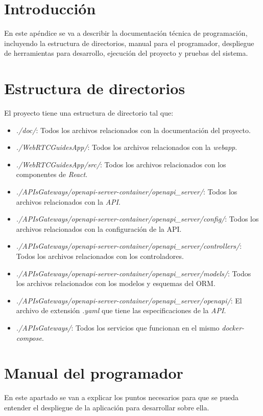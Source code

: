 \section{Introducción}
En este apéndice se va a describir la documentación técnica de programación, incluyendo la estructura de directorios, manual para el programador, despliegue de herramientas para desarrollo, ejecución del proyecto y pruebas del sistema.

\section{Estructura de directorios}
El proyecto tiene una estructura de directorio tal que:
\begin{itemize}
    \item \textit{./doc/}: Todos los archivos relacionados con la documentación del proyecto.
    \item \textit{./WebRTCGuidesApp/}: Todos los archivos relacionados con la \textit{webapp}.
    \item \textit{./WebRTCGuidesApp/src/}: Todos los archivos relacionados con los componentes de \textit{React}.
    \item \textit{./APIsGateways/openapi-server-container/openapi\_server/}: Todos los archivos relacionados con la \textit{API}.
    \item \textit{./APIsGateways/openapi-server-container/openapi\_server/config/}: Todos los archivos relacionados con la configuración de la API.
    \item \textit{./APIsGateways/openapi-server-container/openapi\_server/controllers/}: Todos los archivos relacionados con los controladores.
    \item \textit{./APIsGateways/openapi-server-container/openapi\_server/models/}: Todos los archivos relacionados con los modelos y esquemas del ORM.
    \item \textit{./APIsGateways/openapi-server-container/openapi\_server/openapi/}: El archivo de extensión \textit{.yaml} que tiene las especificaciones de la \textit{API}.
    \item \textit{./APIsGateways/}: Todos los servicios que funcionan en el mismo \textit{docker-compose}.

\end{itemize}

\section{Manual del programador}
En este apartado se van a explicar los puntos necesarios para que se pueda entender el despliegue de la aplicación para desarrollar sobre ella.

